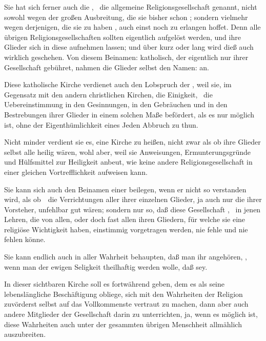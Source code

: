 \begin{aufza}
\item Sie hat sich ferner auch die , \dh\  die allgemeine Religionsgesellschaft genannt, nicht sowohl wegen der großen Ausbreitung, die sie bisher schon ; sondern vielmehr wegen derjenigen, die sie zu haben , auch einst noch zu erlangen hoffet. Denn alle übrigen Religionsgesellschaften sollten eigentlich aufgelöst werden, und ihre Glieder sich in diese aufnehmen lassen; und über kurz oder lang wird dieß auch wirklich geschehen. Von diesem Beinamen: katholisch, der eigentlich nur ihrer Gesellschaft gebühret, nahmen die Glieder selbst den Namen:  an.
\item Diese katholische Kirche verdienet auch den Lobspruch der , weil sie, im Gegensatz mit den andern christlichen Kirchen, die Einigkeit, \dh\  die Uebereinstimmung in den Gesinnungen, in den Gebräuchen und in den Bestrebungen ihrer Glieder in einem solchen Maße befördert, als es nur möglich ist, ohne der Eigenthümlichkeit eines Jeden Abbruch zu thun.
\item Nicht minder verdient sie es, eine  Kirche zu heißen, nicht zwar als ob ihre Glieder selbst alle heilig wären, wohl aber, weil sie Anweisungen, Ermunterungsgründe und Hülfsmittel zur Heiligkeit anbeut, wie keine andere Religionsgesellschaft in einer gleichen Vortrefflichkeit aufweisen kann.
\item Sie kann sich auch den Beinamen einer  beilegen, wenn er nicht so verstanden wird, als ob~\ die Verrichtungen aller ihrer einzelnen Glieder, ja auch nur die ihrer Vorsteher, unfehlbar gut wären; sondern nur so, daß diese Gesellschaft , \dh\  in jenen Lehren, die von allen, oder doch fast allen ihren Gliedern, für welche sie eine religiöse Wichtigkeit haben, einstimmig vorgetragen werden, nie fehle und nie fehlen könne.
\item Sie kann endlich auch in aller Wahrheit behaupten, daß man ihr angehören, , wenn man der ewigen Seligkeit theilhaftig werden wolle, daß  sey.
\item In dieser sichtbaren Kirche soll es fortwährend  geben, dem es als seine lebenslängliche Beschäftigung obliege, sich mit den Wahrheiten der Religion zuvörderst selbst auf das Vollkommenste vertraut zu machen, dann aber auch andere Mitglieder der Gesellschaft darin zu unterrichten, ja, wenn es möglich ist, diese Wahrheiten auch unter der gesammten übrigen Menschheit allmählich auszubreiten.

\end{aufza}
